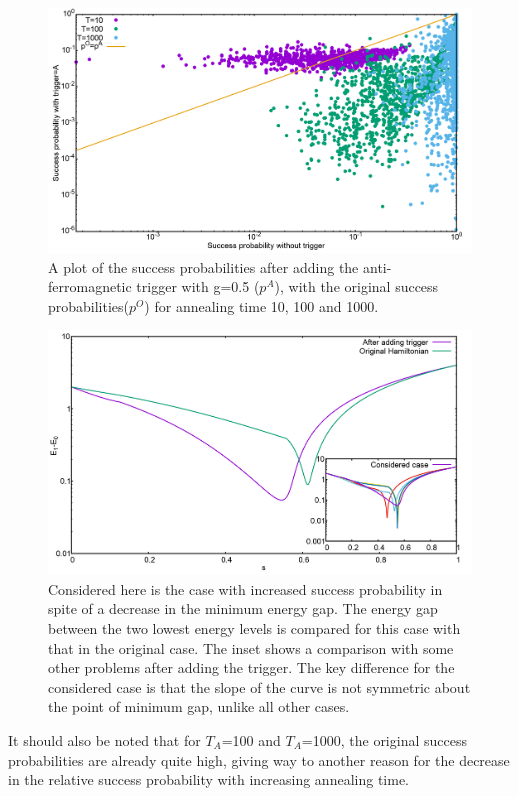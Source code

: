 \documentclass[../main.tex]{subfiles}
\begin{document}
\begin{figure}[H]
\centering 
\includegraphics[scale=0.3]{ProbScat_g0.png}
\caption{A plot of the success probabilities after adding the anti-ferromagnetic trigger with g=0.5 ($p^A$), with the original success probabilities($p^O$) for annealing time 10, 100 and 1000.}
\label{fig:a14}
\end{figure}

\begin{figure}[H]
\centering 
\includegraphics[scale=0.3]{Mingap_709_g0_A.png}
\caption{Considered here is the case with increased success probability in spite of a decrease in the minimum energy gap. The energy gap between the two lowest energy levels is compared for this case with that in the original case. The inset shows a comparison with some other problems after adding the trigger. The key difference for the considered case is that the slope of the curve is not symmetric about the point of minimum gap, unlike all other cases. }
\label{fig:a15}
\end{figure}
 
It should also be noted that for $T_A$=100 and $T_A$=1000, the original success probabilities are already quite high, giving way to another reason for the decrease in the relative success probability with increasing annealing time. \\
\end{document}
